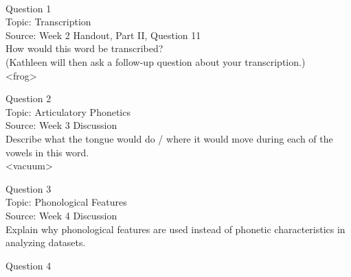 \documentclass[12pt]{article}
\begin{document}
\newpage

\begin{center}
\textbf{{\color{red}{\HUGE END OF EXAM}}}\\

\end{center}
\newpage

\begin{center}
\textbf{{\color{blue}{\HUGE START OF EXAM\\}}}

\textbf{{\color{blue}{\HUGE Student ID: 92054\\}}}

\textbf{{\color{blue}{\HUGE \\}}}

\end{center}
\newpage

{\large Question 1}\\

Topic: Transcription\\
Source: Week 2 Handout, Part II, Question 11\\

How would this word be transcribed?\\ (Kathleen will then ask a follow-up question about your transcription.)\\

<frog>


\newpage

{\large Question 2}\\

Topic: Articulatory Phonetics\\
Source: Week 3 Discussion\\

Describe what the tongue would do / where it would move during each of the vowels in this word.\\

<vacuum>


\newpage

{\large Question 3}\\

Topic: Phonological Features\\
Source: Week 4 Discussion\\

Explain why phonological features are used instead of phonetic characteristics in analyzing datasets.\\


\newpage

{\large Question 4}\\
\end{document}
